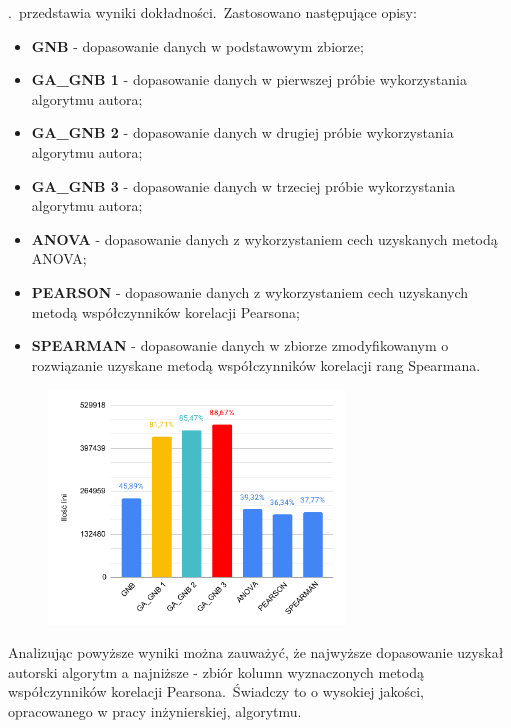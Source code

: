.\ przedstawia wyniki dokładności.\ Zastosowano następujące opisy:
\begin{itemize}
    \item \textbf{GNB} - dopasowanie danych w podstawowym zbiorze;
    \item \textbf{GA\_GNB 1} - dopasowanie danych w pierwszej próbie wykorzystania algorytmu autora;
    \item \textbf{GA\_GNB 2} - dopasowanie danych w drugiej próbie wykorzystania algorytmu autora;
    \item \textbf{GA\_GNB 3} - dopasowanie danych w trzeciej próbie wykorzystania algorytmu autora;
    \item \textbf{ANOVA} - dopasowanie danych z wykorzystaniem cech uzyskanych metodą ANOVA;
    \item \textbf{PEARSON} - dopasowanie danych z wykorzystaniem cech uzyskanych metodą współczynników korelacji Pearsona;
    \item \textbf{SPEARMAN} - dopasowanie danych w zbiorze zmodyfikowanym o rozwiązanie uzyskane metodą  współczynników korelacji rang Spearmana.
\end{itemize}


\begin{figure}[H]
    \centering
    \includegraphics[width=0.7\textwidth]{images/Monday-WorkingHours_cmp}
    \label{fig:mond}
\end{figure}

Analizując powyższe wyniki można zauważyć, że najwyższe dopasowanie uzyskał autorski algorytm a najniższe - zbiór kolumn wyznaczonych metodą współczynników korelacji Pearsona.\ Świadczy to o wysokiej jakości, opracowanego w pracy inżynierskiej, algorytmu.

